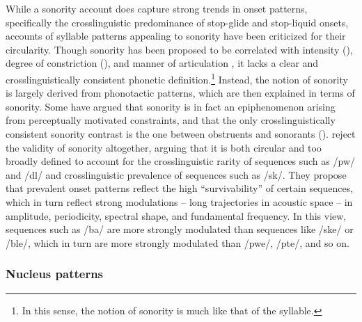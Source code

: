   While a sonority account does capture strong trends in onset patterns, specifically the crosslinguistic predominance of stop-glide and stop-liquid onsets, accounts of syllable patterns appealing to sonority have been criticized for their circularity. Though sonority has been proposed to be correlated with intensity (\citealt{Gordon2002,Parker2002}), degree of constriction (\citealt{Chin1996,Cser2003}), and manner of articulation \citep{Parker2011}, it lacks a clear and crosslinguistically consistent phonetic definition.\footnote{{In this sense, the notion of sonority is much like that of the syllable.}} Instead, the notion of sonority is largely derived from phonotactic patterns, which are then explained in terms of sonority. Some have argued that sonority is in fact an epiphenomenon arising from perceptually motivated constraints, and that the only crosslinguistically consistent sonority contrast is the one between obstruents and sonorants (\citealt{JanyEtAl2007,HenkeEtAl2012}). \citet{OhalaKawasaki-Fukumori1997} reject the validity of sonority altogether, arguing that it is both circular and too broadly defined to account for the crosslinguistic rarity of sequences such as /pw/ and /dl/ and crosslinguistic prevalence of sequences such as /sk/. They propose that prevalent onset patterns reflect the high ``survivability'' of certain sequences, which in turn reflect strong modulations -- long trajectories in acoustic space --  in amplitude, periodicity, spectral shape, and fundamental frequency. In this view, sequences such as /ba/ are more strongly modulated than sequences like /ske/ or /ble/, which in turn are more strongly modulated than /pwe/, /pte/, and so on.

\subsubsection{{Nucleus} {patterns}}\label{sec:1.1.2.4}

